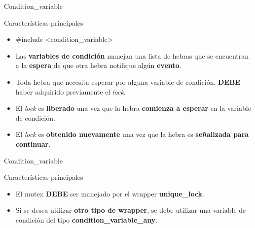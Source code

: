 \begin{frame}[fragile]{Condition\_variable}
\begin{block}{Características principales}
\begin{itemize}
  \item \#include \textless condition\_variable\textgreater
  \item Las \textbf{variables de condición} manejan una lista de hebras que se encuentran a la \textbf{espera} de que otra hebra notifique algún \textbf{evento}.
  \item Toda hebra que necesita esperar por alguna variable de condición, \textbf{DEBE} haber adquirido previamente el \textit{lock}.
  \item El \textit{lock} es \textbf{liberado} una vez que la hebra \textbf{comienza a esperar} en la variable de condición.
  \item El \textit{lock} es \textbf{obtenido nuevamente} una vez que la hebra es \textbf{señalizada para continuar}.
\end{itemize}
\end{block}
\end{frame}

\begin{frame}[fragile]{Condition\_variable}
\begin{block}{Características principales}
\begin{itemize}
  \item El mutex \textbf{DEBE} ser manejado por el wrapper \textbf{unique\_lock}.
  \item Si se desea utilizar \textbf{otro tipo de wrapper}, se debe utilizar una variable de condición del tipo \textbf{condition\_variable\_any}.
\end{itemize}
\end{block}
\end{frame}

